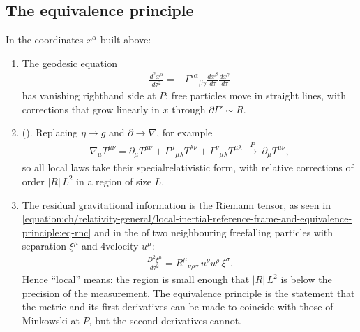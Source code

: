 \documentclass[letterpaper,10pt,english]{jupyterBook}
\begin{document}
\subsection{The equivalence principle}
\label{\detokenize{ch/relativity-general/local-inertial-reference-frame-and-equivalence-principle:the-equivalence-principle}}
\sphinxAtStartPar
In the coordinates \(x^\alpha\) built above:
\begin{enumerate}
%
\item {} 
\sphinxAtStartPar
{} The geodesic equation
\begin{equation*}
\begin{split}
   \frac{d^2x^\alpha}{d\tau^2}=-\Gamma'^\alpha{}_{\beta\gamma}\frac{dx^\beta}{d\tau}\frac{dx^\gamma}{d\tau}
   \end{split}
\end{equation*}
\sphinxAtStartPar
has vanishing right\sphinxhyphen{}hand side at \(P\): free particles move in straight lines, with corrections that grow linearly in \(x\) through \(\partial\Gamma'\sim R\).

\item {} 
\sphinxAtStartPar
{} (). Replacing \(\eta\to g\) and \(\partial\to\nabla\), for example
\begin{equation*}
\begin{split}
   \nabla_\mu T^{\mu\nu}=\partial_\mu T^{\mu\nu}+\Gamma^\mu{}_{\mu\lambda}T^{\lambda\nu}+\Gamma^\nu{}_{\mu\lambda}T^{\mu\lambda}\ \xrightarrow{\ P\ }\ \partial_\mu T^{\mu\nu},
   \end{split}
\end{equation*}
\sphinxAtStartPar
so all local laws take their special\sphinxhyphen{}relativistic form, with relative corrections of order \(|R|\,L^2\) in a region of size \(L\).

\item {} 
\sphinxAtStartPar
{} The residual gravitational information is the Riemann tensor, as seen in \eqref{equation:ch/relativity-general/local-inertial-reference-frame-and-equivalence-principle:eq-rnc} and in the  of two neighbouring free\sphinxhyphen{}falling particles with separation \(\xi^\mu\) and 4\sphinxhyphen{}velocity \(u^\mu\):
\begin{equation*}
\begin{split}
   \frac{D^2\xi^\mu}{d\tau^2}=R^\mu{}_{\nu\rho\sigma}\,u^\nu u^\rho\,\xi^\sigma .
   \end{split}
\end{equation*}
\sphinxAtStartPar
Hence “local” means: the region is small enough that \(|R|\,L^2\) is below the precision of the measurement. The equivalence principle is the statement that the metric and its first derivatives can be made to coincide with those of Minkowski at \(P\), but the second derivatives cannot.

\end{enumerate}
\end{document}
